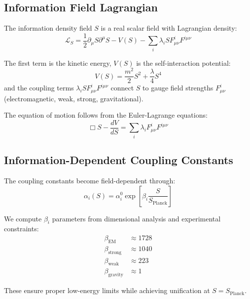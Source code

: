 \documentclass[twocolumn,prd,superscriptaddress,nofootinbib]{revtex4-2}
\newcommand{\sfield}{S}
\newcommand{\splanck}{S_{\text{Planck}}}
\begin{document}
\subsection{Information Field Lagrangian}

The information density field $\sfield$ is a real scalar field with Lagrangian density:
\begin{equation}
\mathcal{L}_{\sfield} = \frac{1}{2} \partial_\mu \sfield \partial^\mu \sfield - V(\sfield) - \sum_i \lambda_i \sfield F^i_{\mu\nu} F^{i\mu\nu}
\label{eq:lagrangian}
\end{equation}

The first term is the kinetic energy, $V(\sfield)$ is the self-interaction potential:
\begin{equation}
V(\sfield) = \frac{m^2}{2} \sfield^2 + \frac{\lambda}{4} \sfield^4
\end{equation}
and the coupling terms $\lambda_i \sfield F^i_{\mu\nu} F^{i\mu\nu}$ connect $\sfield$ to gauge field strengths $F^i_{\mu\nu}$ (electromagnetic, weak, strong, gravitational).

The equation of motion follows from the Euler-Lagrange equations:
\begin{equation}
\Box \sfield - \frac{dV}{d\sfield} = \sum_i \lambda_i F^i_{\mu\nu} F^{i\mu\nu}
\label{eq:EOM}
\end{equation}

\subsection{Information-Dependent Coupling Constants}

The coupling constants become field-dependent through:
\begin{equation}
\alpha_i(\sfield) = \alpha_i^0 \exp\left[\beta_i \frac{\sfield}{\splanck}\right]
\end{equation}

We compute $\beta_i$ parameters from dimensional analysis and experimental constraints:
\begin{align}
\beta_{\text{EM}} &\approx 1728 \\
\beta_{\text{strong}} &\approx 1040 \\
\beta_{\text{weak}} &\approx 223 \\
\beta_{\text{gravity}} &\approx 1
\end{align}

These ensure proper low-energy limits while achieving unification at $\sfield = \splanck$.
\end{document}
